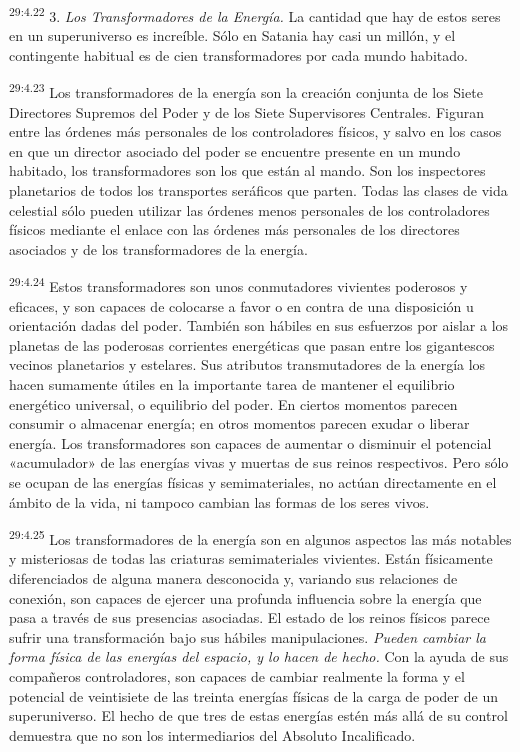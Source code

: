 \par
\textsuperscript{29:4.22} 3. \textit{Los Transformadores de la Energía.} La cantidad que hay de estos seres en un superuniverso es increíble. Sólo en Satania hay casi un millón, y el contingente habitual es de cien transformadores por cada mundo habitado.

\par
\textsuperscript{29:4.23} Los transformadores de la energía son la creación conjunta de los Siete Directores Supremos del Poder y de los Siete Supervisores Centrales. Figuran entre las órdenes más personales de los controladores físicos, y salvo en los casos en que un director asociado del poder se encuentre presente en un mundo habitado, los transformadores son los que están al mando. Son los inspectores planetarios de todos los transportes seráficos que parten. Todas las clases de vida celestial sólo pueden utilizar las órdenes menos personales de los controladores físicos mediante el enlace con las órdenes más personales de los directores asociados y de los transformadores de la energía.

\par
\textsuperscript{29:4.24} Estos transformadores son unos conmutadores vivientes poderosos y eficaces, y son capaces de colocarse a favor o en contra de una disposición u orientación dadas del poder. También son hábiles en sus esfuerzos por aislar a los planetas de las poderosas corrientes energéticas que pasan entre los gigantescos vecinos planetarios y estelares. Sus atributos transmutadores de la energía los hacen sumamente útiles en la importante tarea de mantener el equilibrio energético universal, o equilibrio del poder. En ciertos momentos parecen consumir o almacenar energía; en otros momentos parecen exudar o liberar energía. Los transformadores son capaces de aumentar o disminuir el potencial «acumulador» de las energías vivas y muertas de sus reinos respectivos. Pero sólo se ocupan de las energías físicas y semimateriales, no actúan directamente en el ámbito de la vida, ni tampoco cambian las formas de los seres vivos.

\par
\textsuperscript{29:4.25} Los transformadores de la energía son en algunos aspectos las más notables y misteriosas de todas las criaturas semimateriales vivientes. Están físicamente diferenciados de alguna manera desconocida y, variando sus relaciones de conexión, son capaces de ejercer una profunda influencia sobre la energía que pasa a través de sus presencias asociadas. El estado de los reinos físicos parece sufrir una transformación bajo sus hábiles manipulaciones. \textit{Pueden cambiar la forma física de las energías del espacio, y lo hacen de hecho.} Con la ayuda de sus compañeros controladores, son capaces de cambiar realmente la forma y el potencial de veintisiete de las treinta energías físicas de la carga de poder de un superuniverso. El hecho de que tres de estas energías estén más allá de su control demuestra que no son los intermediarios del Absoluto Incalificado.

